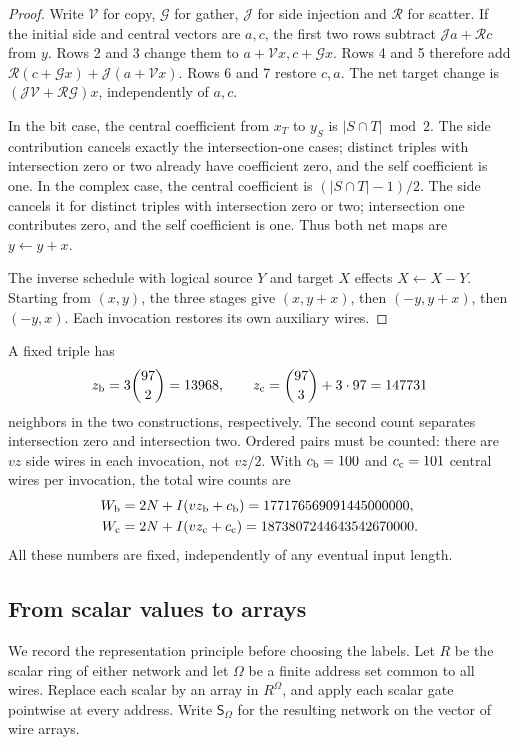 \documentclass[11pt]{article}
\theoremstyle{definition}
\begin{document}
\begin{proof}
Write $\mathcal V$ for copy, $\mathcal G$ for gather,
$\mathcal J$ for side injection and $\mathcal R$ for scatter.
If the initial side and central vectors are $a,c$, the first two rows
subtract $\mathcal J a+\mathcal R c$ from $y$.  Rows 2 and 3 change
them to $a+\mathcal Vx,c+\mathcal Gx$.  Rows 4 and 5 therefore add
$\mathcal R(c+\mathcal Gx)+\mathcal J(a+\mathcal Vx)$.
Rows 6 and 7 restore $c,a$.  The net target change is
$(\mathcal J\mathcal V+\mathcal R\mathcal G)x$, independently of
$a,c$.

In the bit case, the central coefficient from $x_T$ to $y_S$ is
$|S\cap T|\bmod2$.  The side contribution cancels exactly the
intersection-one cases; distinct triples with intersection zero or two
already have coefficient zero, and the self coefficient is one.
In the complex case, the central coefficient is $(|S\cap T|-1)/2$.
The side cancels it for distinct triples with intersection zero or two;
intersection one contributes zero, and the self coefficient is one.
Thus both net maps are $y\gets y+x$.

The inverse schedule with logical source $Y$ and target $X$ effects
$X\gets X-Y$.  Starting from $(x,y)$, the three stages give
$(x,y+x)$, then $(-y,y+x)$, then $(-y,x)$.
Each invocation restores its own auxiliary wires.
\end{proof}

A fixed triple has
\[
 z_{\rm b}=3\binom{97}{2}=13968,\qquad
 z_{\rm c}=\binom{97}{3}+3\cdot97=147731
\]
neighbors in the two constructions, respectively.  The second count
separates intersection zero and intersection two.  Ordered pairs must
be counted: there are $vz$ side wires in each invocation, not $vz/2$.
With $c_{\rm b}=100$ and $c_{\rm c}=101$ central wires per invocation,
the total wire counts are
\begin{align}
 W_{\rm b}&=2N+I(vz_{\rm b}+c_{\rm b})
          =177176569091445000000,\label{eq:bit-wire-count}\\
 W_{\rm c}&=2N+I(vz_{\rm c}+c_{\rm c})
          =1873807244643542670000.\label{eq:complex-wire-count}
\end{align}
All these numbers are fixed, independently of any eventual input length.

\subsection{From scalar values to arrays}

We record the representation principle before choosing the labels.  Let
$R$ be the scalar ring of either network and let $\Omega$ be a finite address
set common to all wires.  Replace each scalar by an array in $R^\Omega$, and
apply each scalar gate pointwise at every address.  Write $\mathsf S_\Omega$
for the resulting network on the vector of wire arrays.
\end{document}
